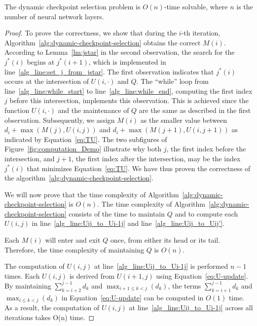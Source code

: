 \begin{theorem}
The dynamic checkpoint selection problem is $O(n)$-time solvable, where $n$ is the number of neural network layers.
\begin{proof}
To prove the correctness, we show that during the $i$-th iteration, Algorithm~\ref{alg:dynamic-checkpoint-selection} obtains the correct $M(i)$.
According to Lemma~\ref{lm:jstar} in the second observation, the search for the $j^*(i)$ begins at $j^*(i + 1)$, which is implemented in line~\ref{alg_line:set_j_from_jstar}.
The first observation indicates that $j^*(i)$ occurs at the intersection of $U(i,\cdot)$ and $Q$.
The ``while'' loop from line~\ref{alg_line:while_start} to line~\ref{alg_line:while_end}, computing the first index $j$ before this intersection, implements this observation.
This is achieved since the function $U(i,\cdot)$ and the maintenance of $Q$ are the same as described in the first observation.
Subsequently, we assign $M(i)$ as the smaller value between $d_i + \max (M(j), U(i, j))$ and $d_i + \max (M(j + 1), U(i, j + 1))$ as indicated by Equation~\ref{eq:TU}.
The two subfigures of Figure~\ref{fig:computation_Demo} illustrate why both $j$, the first index before the intersection, and $j + 1$, the first index after the intersection, may be the index $j^*(i)$ that minimizes Equation~\ref{eq:TU}.
We have thus proven the correctness of the algorithm~\ref{alg:dynamic-checkpoint-selection}.

We will now prove that the time complexity of Algorithm~\ref{alg:dynamic-checkpoint-selection} is $O(n)$.
The time complexity of Algorithm~\ref{alg:dynamic-checkpoint-selection} consists of the time to maintain $Q$ and to compute each $U(i, j)$ in line~\ref{alg_line:Uij_to_Ui-1j} and line~\ref{alg_line:Uij_to_Uij'}.

Each $M(i)$ will enter and exit $Q$ once, from either its head or its tail.
Therefore, the time complexity of maintaining $Q$ is $O(n)$.

The computation of $U(i, j)$ at line~\ref{alg_line:Uij_to_Ui-1j} is performed $n - 1$ times.
Each $U(i, j)$ is derived from $U(i + 1, j)$ using Equation~\ref{eq:U-update}.
By maintaining $\displaystyle\sum_{k = i + 2}^{j - 1} d_k $ and $\displaystyle\max_{i + 1 \leq k < j}(d_k) $, the terms $\displaystyle\sum_{k = i + 1}^{j - 1} d_k $ and $\displaystyle\max_{i \leq k < j}(d_k) $ in Equation~\ref{eq:U-update} can be computed in $O(1)$ time.  
As a result, the computation of $U(i, j)$ at line~\ref{alg_line:Uij_to_Ui-1j} across all iterations takes O(n) time.


\end{proof}
\end{theorem}
